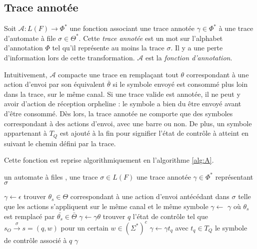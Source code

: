 
\subsection{Trace annotée}\label{trace:annot}

Soit $\mathcal{A}:L(F)\rightarrow\Phi^*$ une fonction associant une trace annotée $\gamma\in\Phi^*$ à une trace d'automate à file $\sigma\in\Theta^*$. Cette \emph{trace annotée} est un mot sur l'alphabet d'annotation $\Phi$ tel qu'il représente au moins la trace $\sigma$. Il y a une perte d'information lors de cette transformation. $\mathcal{A}$ est la \emph{fonction d'annotation}.

Intuitivement, $\mathcal{A}$ compacte une trace en remplaçant tout $\theta$ correspondant à une action d'envoi par son équivalent $\bar{\theta}$ si le symbole envoyé est consommé plus loin dans la trace, sur le même canal. Si une trace valide est annotée, il ne peut y avoir d'action de réception orpheline : le symbole a bien du être envoyé avant d'être consommé. Dès lors, la trace annotée ne comporte que des symboles correspondant à des actions d'envoi, avec une barre ou non. De plus, un symbole appartenant à $T_Q$ est ajouté à la fin pour signifier l'état de contrôle à atteint en suivant le chemin défini par la trace.

Cette fonction est reprise algorithmiquement en l'algorithme \ref{alg:A}.

\begin{algorithm}[H]
  	\begin{algorithmic}[1]
    \REQUIRE un automate à files \fifo , une trace $\sigma\in L(F)$
		\ENSURE une trace annotée $\gamma\in\Phi^*$ représentant $\sigma$

    \STATE $\gamma\leftarrow\epsilon$
        \STATE trouver $\theta_s\in\Theta$ correspondant à une action d'envoi antécédant dans $\sigma$ telle que les actions s'appliquent sur le même canal et le même symbole
        \STATE $\gamma\leftarrow$ $\gamma$ où $\theta_s$ est remplacé par $\bar{\theta_s}\in\bar{\Theta}$ 
        \STATE $\gamma\leftarrow\gamma\theta$
      \ENDIF
    \ENDFOR
    \STATE trouver $q$ l'état de contrôle tel que $s_O\xrightarrow{\sigma}s=(q,w)$ pour un certain $w\in(\Sigma^*)^c$
    \STATE $\gamma\leftarrow\gamma t_q$ avec $t_q\in T_Q$ le symbole de contrôle associé à $q$
		\RETURN $\gamma$
	\end{algorithmic}
	\caption{$\mathcal{A}:L(F)\rightarrow\Phi^*$}\label{alg:A}
\end{algorithm}

